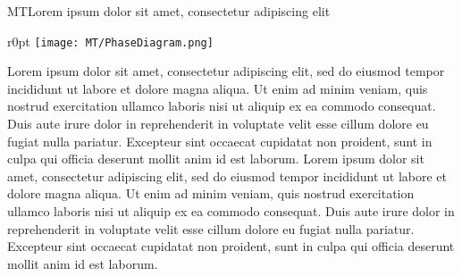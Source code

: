 \begin{section}{MT}{Lorem ipsum dolor sit amet, consectetur adipiscing elit}
  \begin{minipage}{\linewidth}
    \begin{wrapfigure}{r}{0pt}
      \texttt{[image: MT/PhaseDiagram.png]}
    \end{wrapfigure}
    \strut {\small Lorem ipsum dolor sit amet, consectetur adipiscing elit, sed
      do eiusmod tempor incididunt ut labore et dolore magna aliqua. Ut enim ad
      minim veniam, quis nostrud exercitation ullamco laboris nisi ut aliquip ex
      ea commodo consequat. Duis aute irure dolor in reprehenderit in voluptate
      velit esse cillum dolore eu fugiat nulla pariatur. Excepteur sint occaecat
      cupidatat non proident, sunt in culpa qui officia deserunt mollit anim id
      est laborum. Lorem ipsum dolor sit amet, consectetur adipiscing elit, sed
      do eiusmod tempor incididunt ut labore et dolore magna aliqua. Ut enim ad
      minim veniam, quis nostrud exercitation ullamco laboris nisi ut aliquip ex
      ea commodo consequat. Duis aute irure dolor in reprehenderit in voluptate
      velit esse cillum dolore eu fugiat nulla pariatur. Excepteur sint occaecat
      cupidatat non proident, sunt in culpa qui officia deserunt mollit anim id
      est laborum.}
  \end{minipage}
\end{section}

